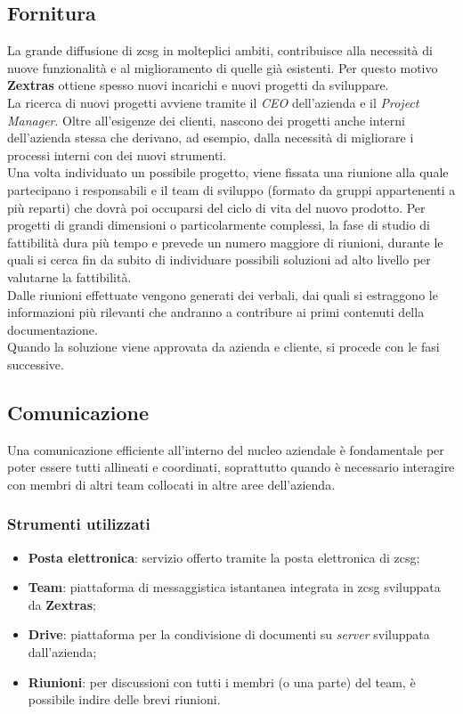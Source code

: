     \subsection{Fornitura}
        La grande diffusione di \gls{zcsg} in molteplici ambiti, contribuisce alla necessità di nuove funzionalità e al miglioramento di quelle già esistenti. Per questo motivo \textbf{Zextras} ottiene spesso nuovi incarichi e nuovi progetti da sviluppare. \\
        La ricerca di nuovi progetti avviene tramite il \textit{CEO} dell'azienda e il \textit{Project Manager}. Oltre all'esigenze dei clienti, nascono dei progetti anche interni dell'azienda stessa che derivano, ad esempio, dalla necessità di migliorare i processi interni con dei nuovi strumenti. \\
        Una volta individuato un possibile progetto, viene fissata una riunione alla quale partecipano i responsabili e il team di sviluppo (formato da gruppi appartenenti a più reparti) che dovrà poi occuparsi del ciclo di vita del nuovo prodotto. Per progetti di grandi dimensioni o particolarmente complessi, la fase di studio di fattibilità dura più tempo e prevede un numero maggiore di riunioni, durante le quali si cerca fin da subito di individuare possibili soluzioni ad alto livello per valutarne la fattibilità. \\
        Dalle riunioni effettuate vengono generati dei verbali, dai quali si estraggono le informazioni più rilevanti che andranno a contribure ai primi contenuti della documentazione. \\
        Quando la soluzione viene approvata da azienda e cliente, si procede con le fasi successive.
    \subsection{Comunicazione}
        Una comunicazione efficiente all'interno del nucleo aziendale è fondamentale per poter essere tutti allineati e coordinati, soprattutto quando è necessario interagire con membri di altri team collocati in altre aree dell'azienda.
        \subsubsection{Strumenti utilizzati}
        \begin{itemize}
            \item \textbf{Posta elettronica}: servizio offerto tramite la posta elettronica di \gls{zcsg};
            \item \textbf{Team}: piattaforma di messaggistica istantanea integrata in \gls{zcsg} sviluppata da \textbf{Zextras};
            \item \textbf{Drive}: piattaforma per la condivisione di documenti su \textit{server} sviluppata dall'azienda;
            \item \textbf{Riunioni}: per discussioni con tutti i membri (o una parte) del team, è possibile indire delle brevi riunioni.
        \end{itemize}

